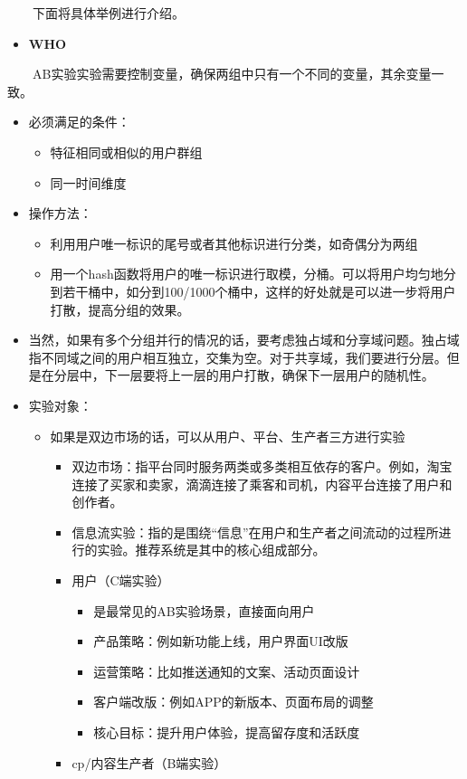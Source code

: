 \documentclass[
  letterpaper,
  DIV=11,
  numbers=noendperiod]{scrreprt}
\providecommand{\tightlist}{%
  \setlength{\itemsep}{0pt}\setlength{\parskip}{0pt}}
\begin{document}
  下面将具体举例进行介绍。

\begin{itemize}
\tightlist
\item
  \textbf{WHO}
\end{itemize}

  AB实验实验需要控制变量，确保两组中只有一个不同的变量，其余变量一致。

\begin{itemize}
\item
  必须满足的条件：

  \begin{itemize}
  \item
    特征相同或相似的用户群组
  \item
    同一时间维度
  \end{itemize}
\item
  操作方法：

  \begin{itemize}
  \item
    利用用户唯一标识的尾号或者其他标识进行分类，如奇偶分为两组
  \item
    用一个hash函数将用户的唯一标识进行取模，分桶。可以将用户均匀地分到若干桶中，如分到100/1000个桶中，这样的好处就是可以进一步将用户打散，提高分组的效果。
  \end{itemize}
\item
  当然，如果有多个分组并行的情况的话，要考虑独占域和分享域问题。独占域指不同域之间的用户相互独立，交集为空。对于共享域，我们要进行分层。但是在分层中，下一层要将上一层的用户打散，确保下一层用户的随机性。
\item
  实验对象：

  \begin{itemize}
  \item
    如果是双边市场的话，可以从用户、平台、生产者三方进行实验

    \begin{itemize}
    \item
      双边市场：指平台同时服务两类或多类相互依存的客户。例如，淘宝连接了买家和卖家，滴滴连接了乘客和司机，内容平台连接了用户和创作者。
    \item
      信息流实验：指的是围绕``信息''在用户和生产者之间流动的过程所进行的实验。推荐系统是其中的核心组成部分。
    \item
      用户（C端实验）

      \begin{itemize}
      \item
        是最常见的AB实验场景，直接面向用户
      \item
        产品策略：例如新功能上线，用户界面UI改版
      \item
        运营策略：比如推送通知的文案、活动页面设计
      \item
        客户端改版：例如APP的新版本、页面布局的调整
      \item
        核心目标：提升用户体验，提高留存度和活跃度
      \end{itemize}
    \item
      cp/内容生产者（B端实验）


\end{itemize}
\end{itemize}
\end{itemize}
\end{document}
